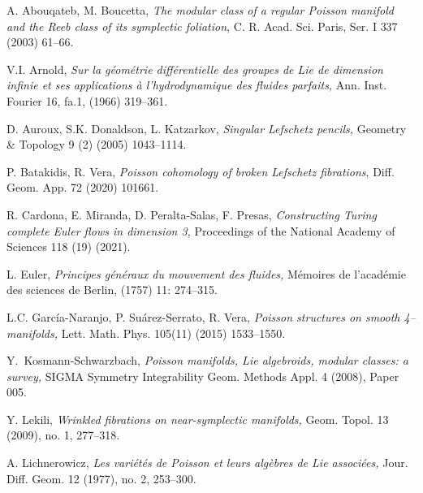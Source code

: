 \documentclass{amsart}
\begin{document}
\providecommand{\bysame}{\leavevmode\hbox to3em{\hrulefill}\thinspace}

\begin{thebibliography}{}
\nocite{*}

 A. Abouqateb, M. Boucetta, {\it The modular class of a regular Poisson manifold and the Reeb class of its symplectic foliation},  C. R. Acad. Sci. Paris, Ser. I 337 (2003) 61--66.

  V.I. Arnold, {\it Sur la géométrie différentielle des groupes de Lie de dimension infinie et ses applications à l'hydrodynamique des fluides parfaits,} Ann. Inst. Fourier 16, fa.1, (1966) 319--361.

 D. Auroux, S.K. Donaldson, L. Katzarkov, {\it Singular Lefschetz pencils,} Geometry \& Topology 9 (2) (2005) 1043--1114.

 P. Batakidis, R. Vera, {\it Poisson cohomology of broken Lefschetz fibrations}, Diff. Geom. App. 72 (2020) 101661.



 R. Cardona, E. Miranda, D. Peralta-Salas, F. Presas, {\it Constructing Turing complete Euler flows in dimension 3,} Proceedings of the National Academy of Sciences 118 (19) (2021).

 L. Euler,  {\it Principes généraux du mouvement des fluides,}  Mémoires de l'académie des sciences de Berlin, (1757) 11: 274--315. 

 L.C. García-Naranjo, P. Suárez-Serrato, R. Vera, {\it Poisson structures on smooth 4–manifolds,} Lett. Math. Phys. 105(11) (2015) 1533--1550.

 Y.~Kosmann-Schwarzbach, {\it  Poisson manifolds, Lie algebroids, modular classes: a survey,} SIGMA Symmetry Integrability Geom. Methods Appl. 4 (2008), Paper 005.

  Y. Lekili, {\it  Wrinkled fibrations on near-symplectic manifolds,} Geom. Topol. 13 (2009), no. 1, 277--318.

 A. Lichnerowicz, {\it Les variétés de Poisson et leurs algèbres de Lie associées,} Jour. Diff. Geom. 12 (1977), no. 2, 253--300.


\end{thebibliography}
\end{document}
